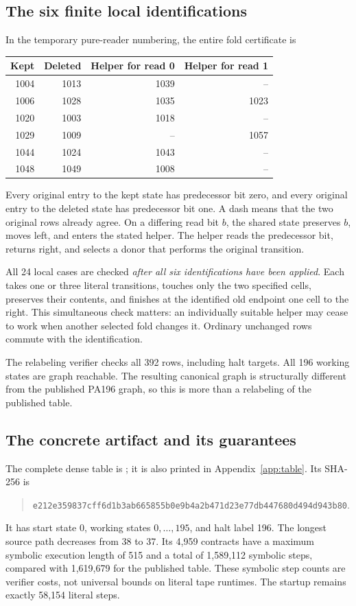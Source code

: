 \documentclass[11pt,letterpaper]{article}
\begin{document}
\subsection{The six finite local identifications}
In the temporary pure-reader numbering, the entire fold certificate is
\begin{center}
\begin{tabular}{@{}rrrr@{}}
\toprule
Kept&Deleted&Helper for read 0&Helper for read 1\\
\midrule
1004&1013&1039&--\\
1006&1028&1035&1023\\
1020&1003&1018&--\\
1029&1009&--&1057\\
1044&1024&1043&--\\
1048&1049&1008&--\\
\bottomrule
\end{tabular}
\end{center}
Every original entry to the kept state has predecessor bit zero, and every
original entry to the deleted state has predecessor bit one. A dash means
that the two original rows already agree. On a differing read bit $b$, the
shared state preserves $b$, moves left, and enters the stated helper. The
helper reads the predecessor bit, returns right, and selects a donor that
performs the original transition.

All 24 local cases are checked \emph{after all six identifications have been
applied}. Each takes one or three literal transitions, touches only the two
specified cells, preserves their contents, and finishes at the identified
old endpoint one cell to the right. This simultaneous check matters: an
individually suitable helper may cease to work when another selected fold
changes it. Ordinary unchanged rows commute with the identification.

The relabeling verifier checks all 392 rows, including halt targets. All 196
working states are graph reachable. The resulting canonical graph is
structurally different from the published PA196 graph, so this is more than
a relabeling of the published table.

\subsection{The concrete artifact and its guarantees}
The complete dense table is
; it is also printed in
Appendix~\ref{app:table}. Its SHA-256 is
\begin{quote}\small
\nolinkurl{e212e359837cff6d1b3ab665855b0e9b4a2b471d23e77db447680d494d943b80}.
\end{quote}
It has start state 0, working states $0,\ldots,195$, and halt label 196.
The longest source path decreases from 38 to 37. Its 4,959 contracts have a
maximum symbolic execution length of 515 and a total of 1,589,112 symbolic
steps, compared with 1,619,679 for the published table. These symbolic step
counts are verifier costs, not universal bounds on literal tape runtimes.
The startup remains exactly 58,154 literal steps.
\end{document}
